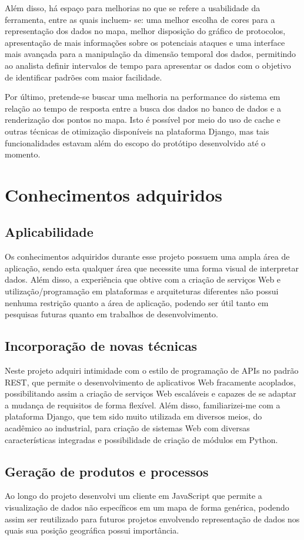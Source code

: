 \documentclass[Portuguese]
{ic-tese-v2}
\begin{document}
Além disso, há espaço para melhorias no que se refere a usabilidade da ferramenta, entre as quais incluem- se: uma melhor escolha de cores para a representação dos dados no mapa, melhor disposição do gráfico de protocolos, apresentação de mais informações sobre os potenciais ataques e uma interface mais avançada para a manipulação da dimensão temporal dos dados, permitindo ao analista definir intervalos de tempo para apresentar os dados com o objetivo de identificar padrões com maior facilidade.

Por último, pretende-se buscar uma melhoria na performance do sistema em relação ao tempo de resposta entre a busca dos dados no banco de dados e a renderização dos pontos no mapa. Isto é possível por meio do uso de cache e outras técnicas de otimização disponíveis na plataforma Django, mas tais funcionalidades estavam além do escopo do protótipo desenvolvido até o momento.


\chapter{Conhecimentos adquiridos}
\section{Aplicabilidade}
Os conhecimentos adquiridos durante esse projeto possuem uma ampla área de aplicação, sendo esta qualquer área que necessite uma forma visual de interpretar dados. Além disso, a experiência que obtive com a criação de serviços Web e utilização/programação em plataformas e arquiteturas diferentes não possui nenhuma restrição quanto a área de aplicação, podendo ser útil tanto em pesquisas futuras quanto em trabalhos de desenvolvimento.

\section{Incorporação de novas técnicas}
Neste projeto adquiri intimidade com o estilo de programação de APIs no padrão REST, que permite o desenvolvimento de aplicativos Web fracamente acoplados, possibilitando assim a criação de serviços Web escaláveis e capazes de se adaptar a mudança de requisitos de forma flexível. Além disso, familiarizei-me com a plataforma Django, que tem sido muito utilizada em diversos meios, do acadêmico ao industrial, para criação de sistemas Web com diversas características integradas e possibilidade de criação de módulos em Python.

\section{Geração de produtos e processos}
Ao longo do projeto desenvolvi um cliente em JavaScript que permite a visualização de dados não específicos em um mapa de forma genérica, podendo assim ser reutilizado para futuros projetos envolvendo representação de dados nos quais sua posição geográfica possui importância.
\end{document}
